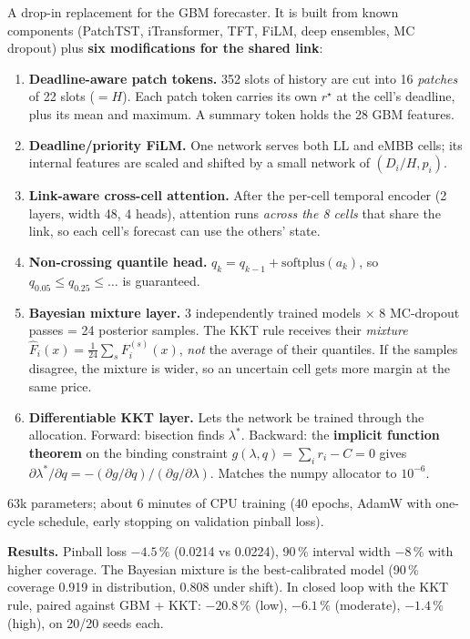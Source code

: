 \documentclass[11pt,a4paper]{article}
\newcommand{\rstar}{r^\star}
\begin{document}
A drop-in replacement for the GBM forecaster. It is built from known components (PatchTST, iTransformer, TFT, FiLM, deep ensembles, MC dropout) plus \textbf{six modifications for the shared link}:
\begin{enumerate}
  \item \textbf{Deadline-aware patch tokens.} 352 slots of history are cut into 16 \emph{patches} of 22 slots ($= H$). Each patch token carries its own $\rstar$ at the cell's deadline, plus its mean and maximum. A summary token holds the 28 GBM features.
  \item \textbf{Deadline/priority FiLM.} One network serves both LL and eMBB cells; its internal features are scaled and shifted by a small network of $(D_i/H, p_i)$.
  \item \textbf{Link-aware cross-cell attention.} After the per-cell temporal encoder (2 layers, width 48, 4 heads), attention runs \emph{across the 8 cells} that share the link, so each cell's forecast can use the others' state.
  \item \textbf{Non-crossing quantile head.} $q_k = q_{k-1} + \mathrm{softplus}(a_k)$, so $q_{0.05}\le q_{0.25}\le\dots$ is guaranteed.
  \item \textbf{Bayesian mixture layer.} 3 independently trained models $\times$ 8 MC-dropout passes = 24 posterior samples. The KKT rule receives their \emph{mixture} $\hat F_i(x) = \frac{1}{24}\sum_s F_i^{(s)}(x)$, \emph{not} the average of their quantiles. If the samples disagree, the mixture is wider, so an uncertain cell gets more margin at the same price.
  \item \textbf{Differentiable KKT layer.} Lets the network be trained through the allocation. Forward: bisection finds $\lambda^\ast$. Backward: the \textbf{implicit function theorem} on the binding constraint $g(\lambda,q) = \sum_i r_i - C = 0$ gives $\partial\lambda^\ast/\partial q = -(\partial g/\partial q)/(\partial g/\partial\lambda)$. Matches the numpy allocator to $10^{-6}$.
\end{enumerate}
63k parameters; about 6 minutes of CPU training (40 epochs, AdamW with one-cycle schedule, early stopping on validation pinball loss).

\textbf{Results.} Pinball loss $-4.5\,\%$ (0.0214 vs 0.0224), 90\,\% interval width $-8\,\%$ with higher coverage. The Bayesian mixture is the best-calibrated model (90\,\% coverage 0.919 in distribution, 0.808 under shift). In closed loop with the KKT rule, paired against GBM + KKT: $-20.8\,\%$ (low), $-6.1\,\%$ (moderate), $-1.4\,\%$ (high), on 20/20 seeds each.
\end{document}
